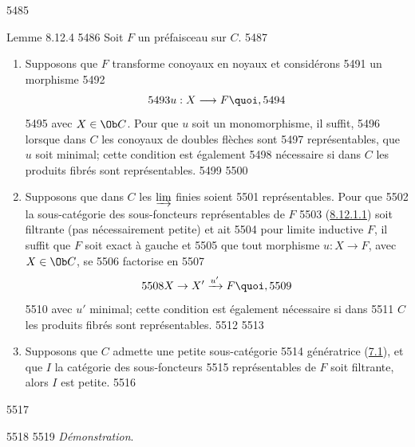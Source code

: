   5485	\begin{enonce*}{Lemme 8.12.4}
  5486	Soit $F$ un préfaisceau sur $C$.
  5487	\begin{enumerate}
  5488	\renewcommand{\theenumi}{\alph{enumi}}
  5489	\renewcommand{\labelenumi}{\theenumi)}
  5490	\item Supposons que $F$ transforme conoyaux en noyaux et considérons
  5491	un morphisme
  5492	$$
  5493	u:X\longrightarrow F{\quoi},
  5494	$$
  5495	avec $X\in \Ob C$. Pour que $u$ soit un monomorphisme, il suffit,
  5496	lorsque dans $C$ les conoyaux de doubles flèches sont
  5497	représentables, que $u$ soit minimal; cette condition est également
  5498	nécessaire si dans $C$ les produits fibrés sont représentables.
  5499	
  5500	\item Supposons que dans $C$ les $\varinjlim$ finies soient
  5501	représentables. Pour que %
  5502	la sous-catégorie des sous-foncteurs représentables de $F$
  5503	(\hyperref[I.8.12.1.1]{8.12.1.1}) soit filtrante (pas nécessairement petite) et ait
  5504	pour limite inductive $F$, il suffit que $F$ soit exact à gauche et
  5505	que tout morphisme $u:X\rightarrow F$, avec $X\in \Ob C$, se
  5506	factorise en
  5507	$$
  5508	X\rightarrow X'\xrightarrow{u'}F{\quoi},
  5509	$$
  5510	avec $u'$ minimal; cette condition est également nécessaire si dans
  5511	$C$ les produits fibrés sont représentables.
  5512	
  5513	\item Supposons que $C$ admette une petite sous-catégorie
  5514	génératrice (\hyperref[I.def7.1]{7.1}), et que $I$ la catégorie des sous-foncteurs
  5515	représentables de $F$ soit filtrante, alors $I$ est petite.
  5516	\end{enumerate}
  5517	\end{enonce*}
  5518	
  5519	\noindent \emph{Démonstration}.\pageoriginale
